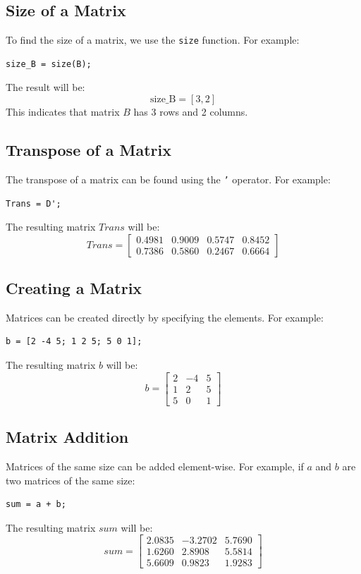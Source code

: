 \documentclass[a4paper,12pt]{article}
\begin{document}
\subsection*{Size of a Matrix}
To find the size of a matrix, we use the \texttt{size} function. For example:
\begin{lstlisting}[style=vscode-light]
	size_B = size(B);
\end{lstlisting}
The result will be:
\[
\text{size\_B} = [3, 2]
\]
This indicates that matrix \( B \) has 3 rows and 2 columns.

\subsection*{Transpose of a Matrix}
The transpose of a matrix can be found using the \texttt{'} operator. For example:
\begin{lstlisting}[style=vscode-light]
	Trans = D';
\end{lstlisting}
The resulting matrix \( Trans \) will be:
\[
Trans = \begin{bmatrix}
	0.4981 & 0.9009 & 0.5747 & 0.8452 \\
	0.7386 & 0.5860 & 0.2467 & 0.6664
\end{bmatrix}
\]

\subsection*{Creating a Matrix}
Matrices can be created directly by specifying the elements. For example:
\begin{lstlisting}[style=vscode-light]
	b = [2 -4 5; 1 2 5; 5 0 1];
\end{lstlisting}
The resulting matrix \( b \) will be:
\[
b = \begin{bmatrix}
	2 & -4 & 5 \\
	1 & 2 & 5 \\
	5 & 0 & 1
\end{bmatrix}
\]

\subsection*{Matrix Addition}
Matrices of the same size can be added element-wise. For example, if \( a \) and \( b \) are two matrices of the same size:
\begin{lstlisting}[style=vscode-light]
	sum = a + b;
\end{lstlisting}
The resulting matrix \( sum \) will be:
\[
sum = \begin{bmatrix}
	2.0835 & -3.2702 & 5.7690 \\
	1.6260 & 2.8908 & 5.5814 \\
	5.6609 & 0.9823 & 1.9283
\end{bmatrix}
\]
\end{document}
